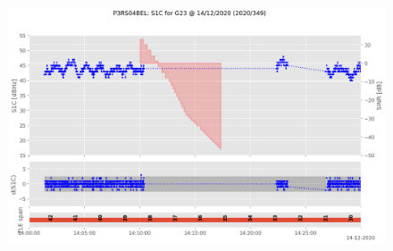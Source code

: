 \begin{enumerate}
\begin{figure}[H]%
\centering%
\includegraphics[width=0.95\linewidth]{png/P3RS04BEL_R_20203490000_01D_00U_MO_G-S1C-G23.png}%
\end{figure}


\end{enumerate}
